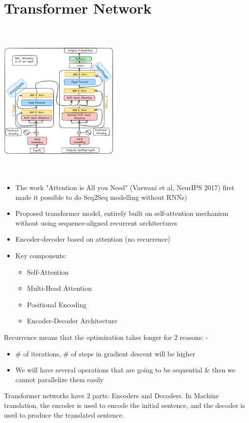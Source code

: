 \documentclass{article}
\begin{document}
\section{Transformer Network}
\begin{minipage}{0.5\textwidth}
\includegraphics[width=6cm, height=8cm]{Transformer/Images/Transformers1.png}
\end{minipage}
\begin{minipage}{0.5\textwidth}
\begin{itemize}
    \item The work "Attention is All you Need" (Vaswani et al, NeurIPS 2017) first made it possible to do Seq2Seq modelling without RNNs)
    \item Proposed transformer model, entirely built on self-attention mechanism without using sequence-aligned recurrent architectures
    \item Encoder-decoder based on attention (no recurrence)
    \item Key components:
    \begin{itemize}
        \item Self-Attention
        \item Multi-Head Attention
        \item Positional Encoding
        \item Encoder-Decoder Architecture
    \end{itemize}
\end{itemize}
\end{minipage}
Recurrence means that the optimization takes longer for 2 reasons: -
\begin{itemize}
    \item \# of iterations, \# of steps in gradient descent will be higher
    \item We will have several operations that are going to be sequential \& then we cannot parallelize them easily
\end{itemize}
Transformer networks have 2 parts: Encoders and Decoders. In Machine translation, the encoder is used to encode the initial sentence, and the decoder is used to produce the translated sentence. 
\end{document}
